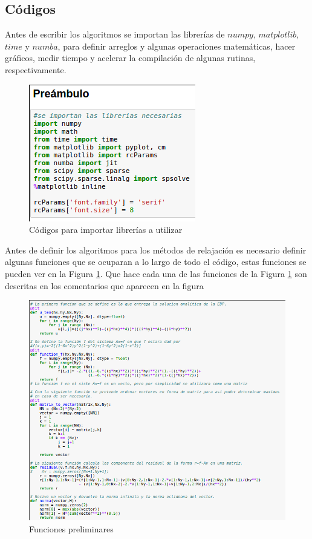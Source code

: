 \documentclass[letter,10pt]{article}
\begin{document}
\subsection{Códigos}

Antes de escribir los algoritmos se importan las librerías de $numpy$, $matplotlib$, $time$ y $numba$, para definir arreglos y algunas operaciones matemáticas, hacer gráficos, medir tiempo y acelerar la compilación de algunas rutinas, respectivamente.

\begin{figure}[H]
\centering
\includegraphics[scale=0.8]{img/preambulo}
\caption{Códigos para importar librerías a utilizar}
\end{figure}

Antes de definir los algoritmos para los métodos de relajación es necesario definir algunas funciones que se ocuparan a lo largo de todo el código, estas funciones se pueden ver en la Figura \ref{funcionesprel}. Que hace cada una de las funciones de la Figura \ref{funcionesprel} son descritas en los comentarios que aparecen en la figura

\begin{figure}[H]
\centering
\includegraphics[scale=0.9]{img/funciones}
\caption{Funciones preliminares}
\label{funcionesprel}
\end{figure} 
\end{document}
